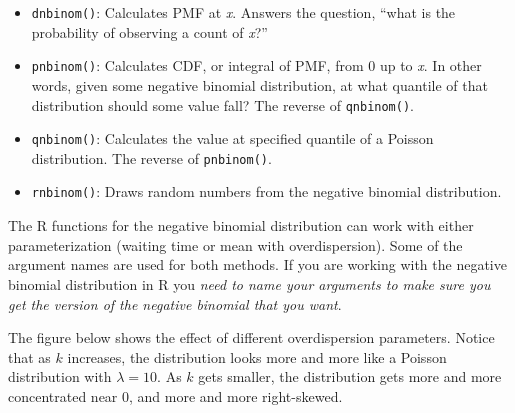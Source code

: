 \documentclass[
  13,
  letterpaper,
]{report}
\providecommand{\tightlist}{%
  \setlength{\itemsep}{0pt}\setlength{\parskip}{0pt}}
\begin{document}
\begin{itemize}
\tightlist
\item
  \texttt{dnbinom()}: Calculates PMF at \emph{x}. Answers the question,
  ``what is the probability of observing a count of \emph{x}?''
\item
  \texttt{pnbinom()}: Calculates CDF, or integral of PMF, from 0 up to
  \emph{x}. In other words, given some negative binomial distribution,
  at what quantile of that distribution should some value fall? The
  reverse of \texttt{qnbinom()}.
\item
  \texttt{qnbinom()}: Calculates the value at specified quantile of a
  Poisson distribution. The reverse of \texttt{pnbinom()}.
\item
  \texttt{rnbinom()}: Draws random numbers from the negative binomial
  distribution.
\end{itemize}

The R functions for the negative binomial distribution can work with
either parameterization (waiting time or mean with overdispersion). Some
of the argument names are used for both methods. If you are working with
the negative binomial distribution in R you \emph{need to name your
arguments to make sure you get the version of the negative binomial that
you want}.

The figure below shows the effect of different overdispersion
parameters. Notice that as \(k\) increases, the distribution looks more
and more like a Poisson distribution with \(\lambda = 10\). As \(k\)
gets smaller, the distribution gets more and more concentrated near 0,
and more and more right-skewed.
\end{document}
